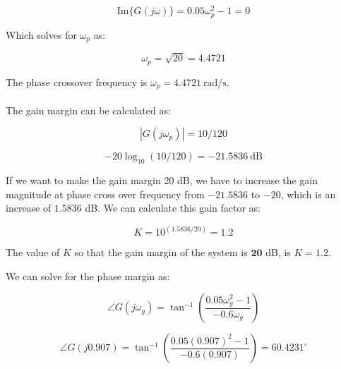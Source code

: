 \documentclass[12pt, letterpaper]{../assignment}
\begin{document}
$$ \text{Im}\{G(j\omega)\} = 0.05\omega_p ^2 - 1 = 0$$

Which solves for $\omega_p$ as:

$$ \omega_p = \sqrt{20} = 4.4721 $$

The phase crossover frequency is $ \omega_p =  4.4721 \ \text{rad/s} $.
\\\\
The gain margin can be calculated as:

$$ |G(j\omega_p)| = 10/120 $$

$$ -20 \log_{10} (10/120) = -21.5836 \ \text{dB} $$

If we want to make the gain margin 20 dB, we have to increase the gain magnitude at phase cross over frequency from $-21.5836$ to $-20$,
which is an increase of $1.5836$ dB.
We can calculate this gain factor as:

$$ K = 10^{(1.5836/20)} = 1.2 $$

\begin{answer}
The value of $K$ so that the gain margin of the system is $\mathbf{20}$ dB, is $K = 1.2$.
\end{answer}

We can solve for the phase margin as:

$$ \angle G(j\omega_g) = \tan^{-1} \left( \frac{0.05\omega_g ^2 - 1}{- 0.6 \omega_g} \right) $$

$$ \angle G(j0.907) = \tan^{-1} \left( \frac{0.05(0.907) ^2 - 1}{- 0.6 (0.907)} \right) = 60.4231^\circ $$


\end{document}
